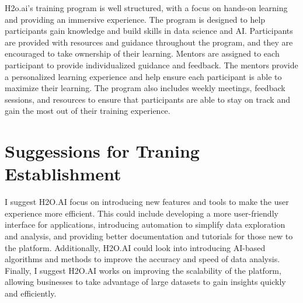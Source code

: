 \documentclass[12pt,a4paper]{report}
\begin{document}
H2o.ai's training program is well structured, with a focus on hands-on learning and providing an immersive experience. The program is designed to help participants gain knowledge and build skills in data science and AI. Participants are provided with resources and guidance throughout the program, and they are encouraged to take ownership of their learning. Mentors are assigned to each participant to provide individualized guidance and feedback. The mentors provide a personalized learning experience and help ensure each participant is able to maximize their learning. The program also includes weekly meetings, feedback sessions, and resources to ensure that participants are able to stay on track and gain the most out of their training experience.

\section{Suggessions for Traning Establishment}
I suggest H2O.AI focus on introducing new features and tools to make the user experience more efficient. This could include developing a more user-friendly interface for applications, introducing automation to simplify data exploration and analysis, and providing better documentation and tutorials for those new to the platform. Additionally, H2O.AI could look into introducing AI-based algorithms and methods to improve the accuracy and speed of data analysis. Finally, I suggest H2O.AI works on improving the scalability of the platform, allowing businesses to take advantage of large datasets to gain insights quickly and efficiently.


\printbibliography
{}
\end{document}
